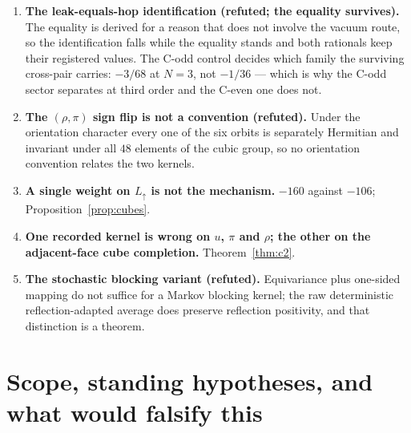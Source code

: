 \documentclass[11pt]{article}
\theoremstyle{definition}
\theoremstyle{remark}
\newcommand{\CF}{C_F}
\newcommand{\Lup}{L_{\uparrow}}
\begin{document}
\begin{enumerate}
  attempted. The leading electric-flux sector gap is $\CF L/(2\sqrt u)$, with
  derivative $-(N^2-1)L/(8Nu^{3/2})$: strictly \emph{decreasing} in $u$, hence
  in $\beta$, at every rank $N\ge2$. And the slope coefficients
  $(n-\tfrac12)\sigma_n$ are negative at every certified order,
  \[
    -\tfrac13,\quad -\tfrac{11}{51},\quad -\tfrac{305}{816},\quad
    -\tfrac{737327120374220449}{2071597225314988800},\quad
    -\tfrac{137767222189182735950309}{446622934758858617760000},
  \]
  so such a monotonicity, if it holds at all, bounds the weak-coupling gap from
  \emph{above} and never from below. The falsifier that would revive the route
  is recorded: a functional of the sector free energies, defined without
  knowledge of the large-$\beta$ behaviour, increasing in $\beta$ at small
  $\beta$, whose positivity at large $\beta$ implies a gap.
\item \textbf{The leak-equals-hop identification (refuted; the equality
  survives).} The equality is derived for a reason that does not involve the
  vacuum route, so the identification falls while the equality stands and both
  rationals keep their registered values. The C-odd control decides which
  family the surviving cross-pair carries: $-3/68$ at $N=3$, not $-1/36$ ---
  which is why the C-odd sector separates at third order and the C-even one
  does not.
\item \textbf{The $(\rho,\pi)$ sign flip is not a convention (refuted).} Under
  the orientation character every one of the six orbits is separately Hermitian
  and invariant under all $48$ elements of the cubic group, so no orientation
  convention relates the two kernels.
\item \textbf{A single weight on $\Lup$ is not the mechanism.} $-160$ against
  $-106$; Proposition~\ref{prop:cubes}.
\item \textbf{One recorded kernel is wrong on $u$, $\pi$ and $\rho$; the other
  on the adjacent-face cube completion.} Theorem~\ref{thm:c2}.
\item \textbf{The stochastic blocking variant (refuted).} Equivariance plus
  one-sided mapping do not suffice for a Markov blocking kernel; the raw
  deterministic reflection-adapted average does preserve reflection positivity,
  and that distinction is a theorem.
\end{enumerate}

\section{Scope, standing hypotheses, and what would falsify this}\label{sec:scope}
\end{document}
